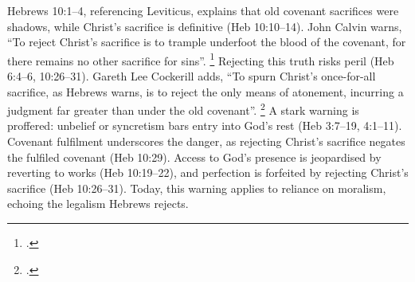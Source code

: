 \documentclass[12pt]{article}
\begin{document}
Hebrews 10:1--4, referencing Leviticus, explains that old covenant sacrifices
were shadows, while Christ’s sacrifice is definitive (Heb 10:10--14). John
Calvin warns, ``To reject Christ’s sacrifice is to trample underfoot the blood
of the covenant, for there remains no other sacrifice for sins''.
\footcite[245]{Calvin1853}
Rejecting this truth risks peril (Heb 6:4--6, 10:26--31).
%
Gareth Lee Cockerill adds, ``To spurn Christ’s once-for-all sacrifice, as
Hebrews warns, is to reject the only means of atonement, incurring a judgment
far greater than under the old covenant''. \footcite[482]{Cockerill2012}
%
A stark warning is proffered:
unbelief or syncretism bars entry into God’s rest (Heb 3:7--19, 4:1--11).
%
Covenant fulfilment underscores the danger, as rejecting Christ’s sacrifice
negates the fulfiled covenant (Heb 10:29).
%
Access to God’s presence is jeopardised by reverting to works (Heb 10:19--22),
and perfection is forfeited by rejecting Christ’s sacrifice (Heb 10:26--31).
%
Today, this warning applies to reliance on moralism, echoing the legalism
Hebrews rejects.
\end{document}
